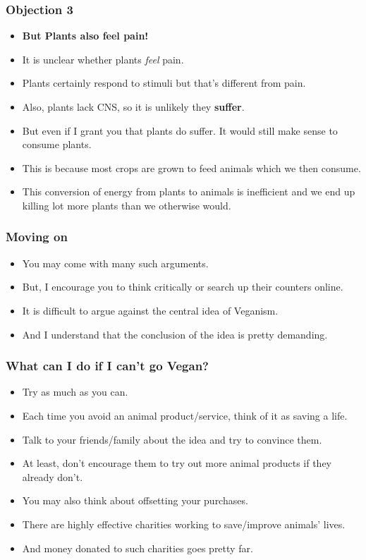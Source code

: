 \documentclass[aspectratio=43]{beamer}
\begin{document}
\begin{frame}
    \frametitle{Objection 3}
    \begin{itemize}
        \item \textbf{But Plants also feel pain!}
        \item It is unclear whether plants \textit{feel} pain. 
        \item Plants certainly respond to stimuli but that's different from pain.
        \item Also, plants lack CNS, so it is unlikely they \textbf{suffer}.
        \item But even if I grant you that plants do suffer. It would still make sense to consume plants. 
        \item This is because most crops are grown to feed animals which we then consume. 
        \item This conversion of energy from plants to animals is inefficient and we end up killing lot more plants than we otherwise would.
    \end{itemize}
\end{frame}

\begin{frame}
    \frametitle{Moving on}
    \begin{itemize}
        \item You may come with many such arguments.
        \item But, I encourage you to think critically or search up their counters online.
        \item It is difficult to argue against the central idea of Veganism.
        \item And I understand that the conclusion of the idea is pretty demanding.
    \end{itemize}
\end{frame}

\begin{frame}
    \frametitle{What can I do if I can't go Vegan?}
    \begin{itemize}
        \item Try as much as you can. 
        \item Each time you avoid an animal product/service, think of it as saving a life.
        \item Talk to your friends/family about the idea and try to convince them.
        \item At least, don't encourage them to try out more animal products if they already don't.
        \item You may also think about offsetting your purchases. 
        \item There are highly effective charities working to save/improve animals' lives.
        \item And money donated to such charities goes pretty far.
    \end{itemize}
\end{frame}
\end{document}
